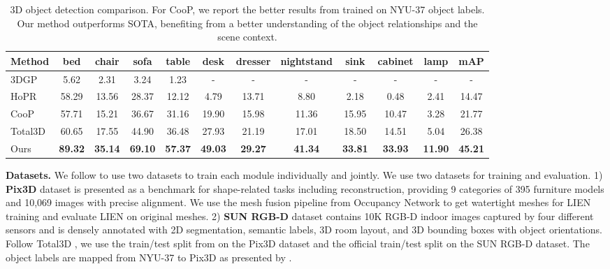 \documentclass[final]{cvpr}
\newcommand{\beforecaption}{\vspace{-1.2em}}
\begin{document}
\begin{table*}[!h]
    \vspace{-0.5em}
	\begin{center}
		\begin{tabular}{|l|c|c|c|c|c|c|c|c|c|c|c|}
			\hline
			Method & bed & chair & sofa & table & desk & dresser & nightstand & sink & cabinet & lamp & mAP\\
			\hline\hline
			3DGP \cite{choi2013understanding} & 5.62 & 2.31 & 3.24 & 1.23 & - & - & - & - & - & - & - \\
			HoPR \cite{huang2018holistic} & 58.29 & 13.56 & 28.37 & 12.12 & 4.79 & 13.71 & 8.80 & 2.18 & 0.48 & 2.41 & 14.47 \\
			CooP \cite{huang2018cooperative} & 57.71 & 15.21 & 36.67 & 31.16 & 19.90 & 15.98 & 11.36 & 15.95 & 10.47 & 3.28 & 21.77\\
			Total3D \cite{nie2020total3dunderstanding} & 60.65 & 17.55 & 44.90 & 36.48 & 27.93 & 21.19 & 17.01 & 18.50 & 14.51& 5.04& 26.38\\
			Ours & \textbf{89.32} & \textbf{35.14} & \textbf{69.10} & \textbf{57.37} & \textbf{49.03} & \textbf{29.27} & \textbf{41.34} & \textbf{33.81} & \textbf{33.93} & \textbf{11.90} & \textbf{45.21}\\
			\hline
		\end{tabular}
	\end{center}
	\vspace{-0.5em}
	\beforecaption
	\caption{3D object detection comparison. For CooP, we report the better results from \cite{nie2020total3dunderstanding} trained on NYU-37 object labels. Our method outperforms SOTA, benefiting from a better understanding of the object relationships and the scene context.}
	\vspace{-1em}
	\label{tbl:3ddetection}
\end{table*}

\noindent \textbf{Datasets.} 
We follow \cite{nie2020total3dunderstanding} to use two datasets to train each module individually and jointly. We use two datasets for training and evaluation.
1) \textbf{Pix3D} dataset \cite{sun2018pix3d} is presented as a benchmark for shape-related tasks including reconstruction, providing 9 categories of 395 furniture models and 10,069 images with precise alignment.
We use the mesh fusion pipeline from Occupancy Network \cite{mescheder2019occupancy} to get watertight meshes for LIEN training and evaluate LIEN on original meshes.
2) \textbf{SUN RGB-D} dataset \cite{song2015sun} contains 10K RGB-D indoor images captured by four different sensors and is densely annotated with 2D segmentation, semantic labels, 3D room layout, and 3D bounding boxes with object orientations.
Follow Total3D \cite{nie2020total3dunderstanding}, we use the train/test split from \cite{gkioxari2019mesh} on the Pix3D dataset and the official train/test split on the SUN RGB-D dataset. 
The object labels are mapped from NYU-37 to Pix3D as presented by \cite{nie2020total3dunderstanding}.
\end{document}
